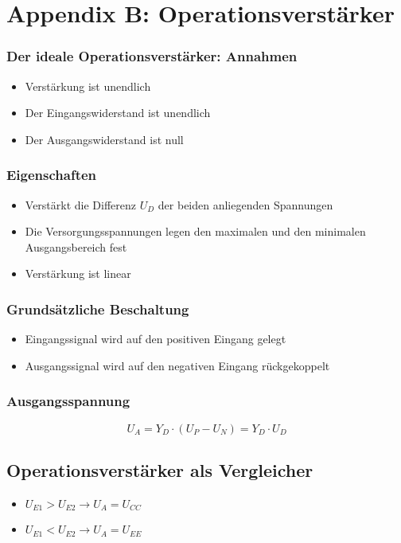 \section{Appendix B: Operationsverstärker}

\subsubsection{Der ideale Operationsverstärker: Annahmen}
\begin{itemize}
	\item Verstärkung ist unendlich
	\item Der Eingangswiderstand ist unendlich
	\item Der Ausgangswiderstand ist null
\end{itemize}

\subsubsection{Eigenschaften}
\begin{itemize}
	\item Verstärkt die Differenz $U_D$ der beiden anliegenden Spannungen
	\item Die Versorgungsspannungen legen den maximalen und den minimalen Ausgangsbereich fest
	\item Verstärkung ist linear
\end{itemize}

\subsubsection{Grundsätzliche Beschaltung}
\begin{itemize}
	\item Eingangssignal wird auf den positiven Eingang gelegt
	\item Ausgangssignal wird auf den negativen Eingang rückgekoppelt
\end{itemize}

\subsubsection{Ausgangsspannung}
\[U_A = Y_D \cdot (U_P - U_N) = Y_D \cdot U_D\]


\subsection{Operationsverstärker als Vergleicher}
\begin{itemize}
	\item $U_{E1} > U_{E2} \rightarrow U_A = U_{CC}$
	\item $U_{E1} < U_{E2} \rightarrow U_A = U_{EE}$
\end{itemize}


